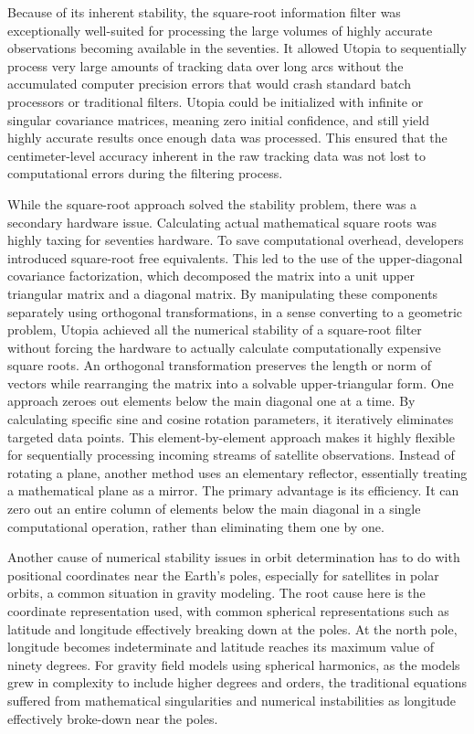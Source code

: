 Because of its inherent stability, the square-root information filter was exceptionally well-suited for processing the large volumes of highly accurate observations becoming available in the seventies. It allowed Utopia to sequentially process very large amounts of tracking data over long arcs without the accumulated computer precision errors that would crash standard batch processors or traditional filters. Utopia could be initialized with infinite or singular covariance matrices, meaning zero initial confidence, and still yield highly accurate results once enough data was processed. This ensured that the centimeter-level accuracy inherent in the raw tracking data was not lost to computational errors during the filtering process. 

While the square-root approach solved the stability problem, there was a secondary hardware issue. Calculating actual mathematical square roots was highly taxing for seventies hardware. To save computational overhead, developers introduced square-root free equivalents. This led to the use of the upper-diagonal covariance factorization, which decomposed the matrix into a unit upper triangular matrix and a diagonal matrix. By manipulating these components separately using orthogonal transformations, in a sense converting to a geometric problem, Utopia achieved all the numerical stability of a square-root filter without forcing the hardware to actually calculate computationally expensive square roots. An orthogonal transformation preserves the length or norm of vectors while rearranging the matrix into a solvable upper-triangular form. One approach zeroes out elements below the main diagonal one at a time. By calculating specific sine and cosine rotation parameters, it iteratively eliminates targeted data points. This element-by-element approach makes it highly flexible for sequentially processing incoming streams of satellite observations. Instead of rotating a plane, another method uses an elementary reflector, essentially treating a mathematical plane as a mirror. The primary advantage is its efficiency. It can zero out an entire column of elements below the main diagonal in a single computational operation, rather than eliminating them one by one.

Another cause of numerical stability issues in orbit determination has to do with positional coordinates near the Earth’s poles, especially for satellites in polar orbits, a common situation in gravity modeling. The root cause here is the coordinate representation used, with common spherical representations such as latitude and longitude effectively breaking down at the poles. At the north pole, longitude becomes indeterminate and latitude reaches its maximum value of ninety degrees. For gravity field models using spherical harmonics, as the models grew in complexity to include higher degrees and orders, the traditional equations suffered from mathematical singularities and numerical instabilities as longitude effectively broke-down near the poles. 

